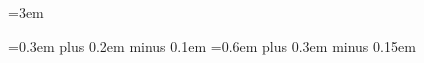 
\pagestyle{fancy}

\renewcommand{\baselinestretch}{1.5}


\emergencystretch=3em

\spaceskip=0.3em plus 0.2em minus 0.1em
\xspaceskip=0.6em plus 0.3em minus 0.15em



\newenvironment{listenabsatz}{%
	\begin{itemize}[nosep,left=0pt,labelwidth=*,itemsep=0pt,parsep=0pt,topsep=0pt]%
		}{%
	\end{itemize}%
}

\newenvironment{listenabsatz*}{%
	\begin{enumerate}[nosep,left=0pt,labelwidth=*,itemsep=0pt,parsep=0pt,topsep=0pt]%
		}{%
	\end{enumerate}%
}

